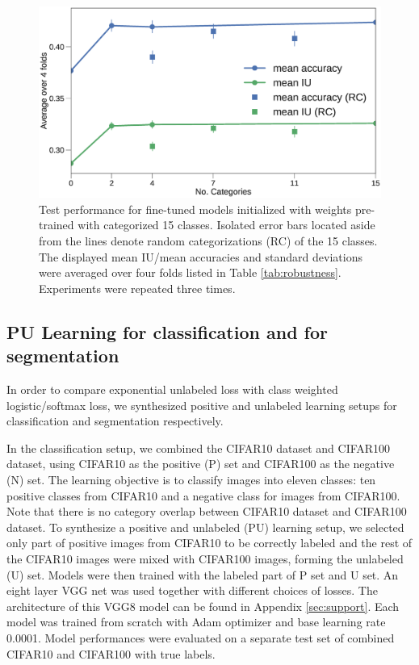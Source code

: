 \begin{figure}[t]
\centering
   \includegraphics[width=1.\linewidth]{img/num_classes.eps}
\caption{
Test performance for fine-tuned models initialized with weights pre-trained with categorized 15 classes.
Isolated error bars located aside from the lines denote random categorizations (RC) of the 15 classes.
The displayed mean IU/mean accuracies and standard deviations were averaged over four folds listed in Table \ref{tab:robustness}.
Experiments were repeated three times.
}
\label{fig:categories}
\end{figure}


\subsection{PU Learning for classification and for segmentation}
\label{subsec:pulearning}

In order to compare exponential unlabeled loss with class weighted logistic/softmax loss, we synthesized positive and unlabeled learning setups for classification and segmentation respectively.

In the classification setup, we combined the CIFAR10 dataset and CIFAR100 dataset, using CIFAR10 as the positive (P) set and CIFAR100 as the negative (N) set.
The learning objective is to classify images into eleven classes: ten positive classes from CIFAR10 and a negative class for images from CIFAR100.
Note that there is no category overlap between CIFAR10 dataset and CIFAR100 dataset.
To synthesize a positive and unlabeled (PU) learning setup, we selected only part of positive images from CIFAR10 to be correctly labeled and the rest of the CIFAR10 images were mixed with CIFAR100 images, forming the unlabeled (U) set.
Models were then trained with the labeled part of P set and U set.
An eight layer VGG net was used together with different choices of losses.
The architecture of this VGG8 model can be found in Appendix \ref{sec:support}.
Each model was trained from scratch with Adam optimizer and base learning rate 0.0001.
Model performances were evaluated on a separate test set of combined CIFAR10 and CIFAR100 with true labels.

